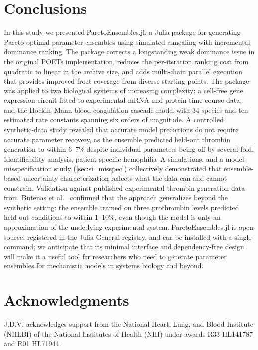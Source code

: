 \documentclass[12pt]{article}
\begin{document}
\section{Conclusions}\label{sec:conclusions}
In this study we presented ParetoEnsembles.jl, a Julia package for generating Pareto-optimal parameter ensembles using simulated annealing with incremental dominance ranking. The package corrects a longstanding weak dominance issue in the original POETs implementation, reduces the per-iteration ranking cost from quadratic to linear in the archive size, and adds multi-chain parallel execution that provides improved front coverage from diverse starting points. The package was applied to two biological systems of increasing complexity: a cell-free gene expression circuit fitted to experimental mRNA and protein time-course data, and the Hockin--Mann blood coagulation cascade model with 34 species and ten estimated rate constants spanning six orders of magnitude. A controlled synthetic-data study revealed that accurate model predictions do not require accurate parameter recovery, as the ensemble predicted held-out thrombin generation to within 6--7\% despite individual parameters being off by several-fold. Identifiability analysis, patient-specific hemophilia~A simulations, and a model misspecification study (\cref{sec:si_misspec}) collectively demonstrated that ensemble-based uncertainty characterization reflects what the data can and cannot constrain. Validation against published experimental thrombin generation data from~Butenas et al.~\cite{Butenas1999} confirmed that the approach generalizes beyond the synthetic setting: the ensemble trained on three prothrombin levels predicted held-out conditions to within 1--10\%, even though the model is only an approximation of the underlying experimental system. ParetoEnsembles.jl is open source, registered in the Julia General registry, and can be installed with a single command; we anticipate that its minimal interface and dependency-free design will make it a useful tool for researchers who need to generate parameter ensembles for mechanistic models in systems biology and beyond.

\section*{Acknowledgments}
J.D.V. acknowledges support from the National Heart, Lung, and Blood Institute (NHLBI) of the National Institutes of Health (NIH) under awards R33 HL141787 and R01 HL71944.
\end{document}
